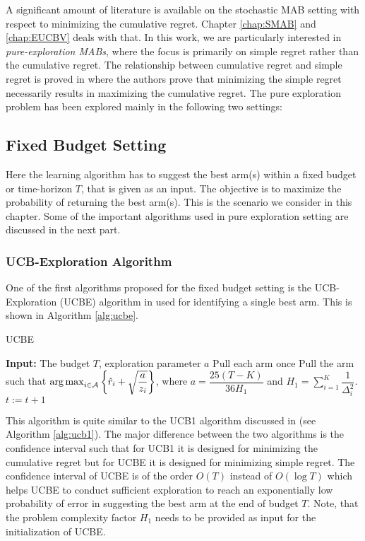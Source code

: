 A significant amount of literature is available on the stochastic MAB setting with respect to minimizing the cumulative regret. Chapter \ref{chap:SMAB} and \ref{chap:EUCBV} deals with that. In this work, we are particularly interested in \emph{pure-exploration MABs},  where the focus is primarily on simple regret rather than the cumulative regret. The relationship between cumulative regret and simple regret is proved in \citet{bubeck2011pure} where the authors prove that minimizing the simple regret necessarily results in maximizing the cumulative regret.
The pure exploration problem has been explored  mainly in the following two settings:
    
\subsection{Fixed Budget Setting} 

Here the learning algorithm has to suggest the best arm(s) within a fixed budget or time-horizon $T$, that is given as an input. The objective is to maximize the probability of returning the best arm(s).  This is the scenario we consider in this chapter. Some of the important algorithms used in pure exploration setting are discussed in the next part.

\subsubsection{UCB-Exploration Algorithm}

One of the first algorithms proposed for the fixed budget setting is the UCB-Exploration (UCBE) algorithm in \citet{audibert2010best} used for identifying a single best arm. This is shown in Algorithm \ref{alg:ucbe}.


\begin{algorithm}[!ht]
\caption{UCBE}
\label{alg:ucbe}
\begin{algorithmic}[1]
\State \textbf{Input: } The budget $T$, exploration parameter $a$
\State Pull each arm once
\State Pull the arm such that $\operatorname*{arg\,max}_{i\in \mathcal{A}}\bigg\lbrace\hat{r}_{i} + \sqrt{\dfrac{a}{z_i}}\bigg\rbrace$, where $a = \dfrac{25(T-K)}{36 H_1}$ and $H_1 = \sum_{i=1}^{K}\dfrac{1}{\Delta_i^2}$.
\State $t:=t+1 $
\EndFor
\end{algorithmic}
\end{algorithm}

This algorithm is quite similar to the UCB1 algorithm discussed in \citet{auer2002finite} (see Algorithm \ref{alg:ucb1}). The major difference between the two algorithms is the confidence interval such that for UCB1 it is designed for minimizing the cumulative regret but for UCBE it is designed for minimizing simple regret. The confidence interval of UCBE is of the order $O\left( T\right)$ instead of $O\left(\log T\right)$ which helps UCBE to conduct sufficient exploration to reach an exponentially low probability of error in suggesting the best arm at the end of budget $T$. Note, that the problem complexity factor $H_1$ needs to be provided as input for the initialization of UCBE.

